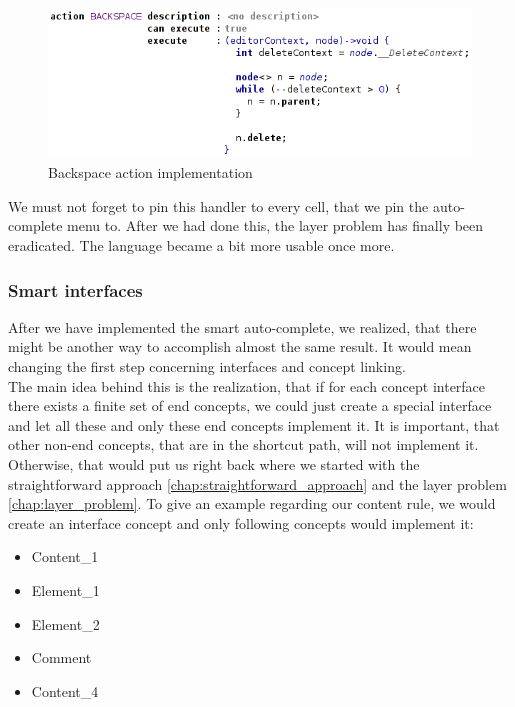 \begin{figure}[h]
	\centering
	\includegraphics[width=\textwidth]{./img/backspace_action.png}
	\caption{Backspace action implementation}
	\label{fig:backspace_action}
\end{figure}

We must not forget to pin this handler to every cell, that we pin the auto-complete menu to.
After we had done this, the layer problem has finally been eradicated.
The language became a bit more usable once more.

\subsubsection{Smart interfaces}

After we have implemented the smart auto-complete, we realized, that there might be another way to accomplish almost the same result.
It would mean changing the first step concerning interfaces and concept linking.
\\

The main idea behind this is the realization, that if for each concept interface there exists a finite set of end concepts, we could just create a special interface and let all these and only these end concepts implement it.
It is important, that other non-end concepts, that are in the shortcut path, will not implement it.
Otherwise, that would put us right back where we started with the straightforward approach \ref{chap:straightforward_approach} and the layer problem \ref{chap:layer_problem}.
To give an example regarding our content rule, we would create an  interface concept and only following concepts would implement it:

\begin{itemize}
	\itemsep0em
	\item Content{\_}1
	\item Element{\_}1
	\item Element{\_}2
	\item Comment
	\item Content{\_}4
\end{itemize}

